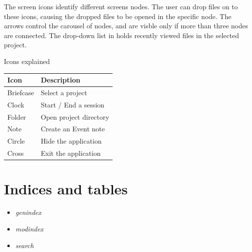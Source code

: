 \documentclass[letterpaper,10pt,english]{sphinxmanual}
\begin{document}
The screen icons identify different screens nodes. The user can drop files on to these icons, causing the dropped files to be opened in the specific node. The arrows control the carousel of nodes, and are visble only if more than three nodes are connected. The drop-down list in holds recently viewed files in the selected project.


\begin{threeparttable}
\capstart\caption{Icons explained}

\begin{tabulary}{\linewidth}{|L|L|}
\hline
\textbf{\relax 
Icon
} & \textbf{\relax 
Description
}\\\hline

Briefcase
 & 
Select a project
\\\hline

Clock
 & 
Start / End a session
\\\hline

Folder
 & 
Open project directory
\\\hline

Note
 & 
Create an Event note
\\\hline

Circle
 & 
Hide the application
\\\hline

Cross
 & 
Exit the application
\\\hline
\end{tabulary}

\end{threeparttable}



\chapter{Indices and tables}
\label{index:indices-and-tables}\begin{itemize}
\item {} 
\emph{genindex}

\item {} 
\emph{modindex}

\item {} 
\emph{search}

\end{itemize}
\end{document}
